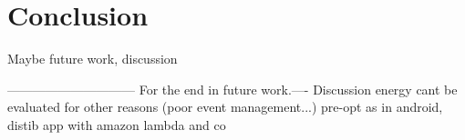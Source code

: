 \documentclass[a4paper,12pt,twoside]{../includes/ThesisStyle}
\begin{document}
\fi

\chapter{Conclusion}
\label{chap:conclusion}
\minitoc

Maybe future work, discussion


------------------------------
For the end in future work.----
Discussion energy cant be evaluated for other reasons (poor event management...) pre-opt as in android, distib app with amazon lambda and co

\ifx\wholebook\relax\else
    
\end{document}
